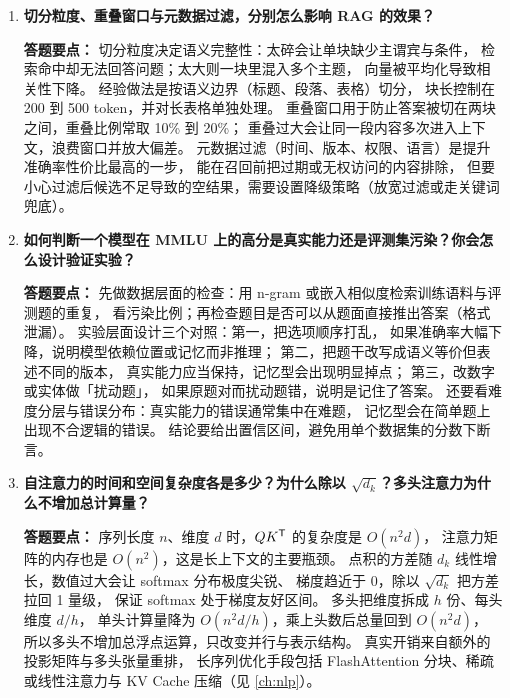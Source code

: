 \begin{interview}[题库与答题要点]

\begin{enumerate}[label=]

  \item[\textcolor{VioletDeep}{\textbf{Q50.}}] \textbf{切分粒度、重叠窗口与元数据过滤，分别怎么影响 RAG 的效果？}
\par\smallskip\noindent\textcolor{VioletDeep}{\textbf{答题要点：}}
切分粒度决定语义完整性：太碎会让单块缺少主谓宾与条件，
检索命中却无法回答问题；太大则一块里混入多个主题，
向量被平均化导致相关性下降。
经验做法是按语义边界（标题、段落、表格）切分，
块长控制在 200 到 500 token，并对长表格单独处理。
重叠窗口用于防止答案被切在两块之间，重叠比例常取 10\% 到 20\%；
重叠过大会让同一段内容多次进入上下文，浪费窗口并放大偏差。
元数据过滤（时间、版本、权限、语言）是提升准确率性价比最高的一步，
能在召回前把过期或无权访问的内容排除，
但要小心过滤后候选不足导致的空结果，需要设置降级策略（放宽过滤或走关键词兜底）。

  \item[\textcolor{VioletDeep}{\textbf{Q51.}}] \textbf{如何判断一个模型在 MMLU 上的高分是真实能力还是评测集污染？你会怎么设计验证实验？}
\par\smallskip\noindent\textcolor{VioletDeep}{\textbf{答题要点：}}
先做数据层面的检查：用 n-gram 或嵌入相似度检索训练语料与评测题的重复，
看污染比例；再检查题目是否可以从题面直接推出答案（格式泄漏）。
实验层面设计三个对照：第一，把选项顺序打乱，
如果准确率大幅下降，说明模型依赖位置或记忆而非推理；
第二，把题干改写成语义等价但表述不同的版本，
真实能力应当保持，记忆型会出现明显掉点；
第三，改数字或实体做「扰动题」，
如果原题对而扰动题错，说明是记住了答案。
还要看难度分层与错误分布：真实能力的错误通常集中在难题，
记忆型会在简单题上出现不合逻辑的错误。
结论要给出置信区间，避免用单个数据集的分数下断言。

  \item[\textcolor{VioletDeep}{\textbf{Q52.}}] \textbf{自注意力的时间和空间复杂度各是多少？为什么除以 $\sqrt{d_k}$？多头注意力为什么不增加总计算量？}
\par\smallskip\noindent\textcolor{VioletDeep}{\textbf{答题要点：}}
序列长度 $n$、维度 $d$ 时，$QK^{\mathsf{T}}$ 的复杂度是 $O(n^2d)$，
注意力矩阵的内存也是 $O(n^2)$，这是长上下文的主要瓶颈。
点积的方差随 $d_k$ 线性增长，数值过大会让 softmax 分布极度尖锐、
梯度趋近于 0，除以 $\sqrt{d_k}$ 把方差拉回 1 量级，
保证 softmax 处于梯度友好区间。
多头把维度拆成 $h$ 份、每头维度 $d/h$，
单头计算量降为 $O(n^2 d/h)$，乘上头数后总量回到 $O(n^2d)$，
所以多头不增加总浮点运算，只改变并行与表示结构。
真实开销来自额外的投影矩阵与多头张量重排，
长序列优化手段包括 FlashAttention 分块、稀疏或线性注意力与 KV Cache 压缩（见 \cref{ch:nlp}）。


\end{enumerate}
\end{interview}
